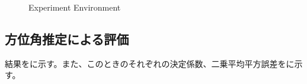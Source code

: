 \begin{figure}[tb]
    \centering
    \label{fig:hand_exp_1plate}
    \label{fig:hand_exp_2plate}
    \caption{Experiment Environment}
    \label{fig:hand_exp_env}
\end{figure}

\clearpage

\subsection{方位角推定による評価}
\label{sec:hand_result}
結果をに示す。また、このときのそれぞれの決定係数、二乗平均平方誤差をに示す。

